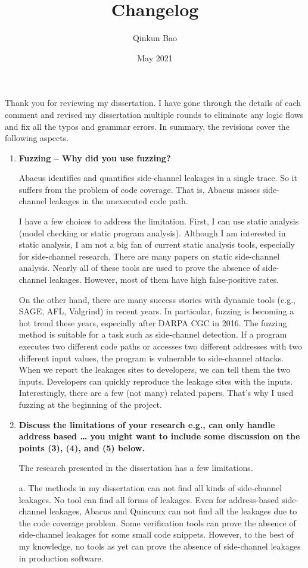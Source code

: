 \documentclass{article}
\title{Changelog}
\author{Qinkun Bao}
\date{May 2021}
\begin{document}
\maketitle
Thank you for reviewing my dissertation. I have gone through the details of each comment and revised my dissertation multiple rounds to eliminate any logic flows and fix all the typos and grammar errors. In summary, the revisions cover the following aspects.


\begin{enumerate}
\item \textbf{Fuzzing – Why did you use fuzzing?}

Abacus identifies and quantifies side-channel leakages in a single trace. So it suffers from the problem of code coverage.  That is, Abacus misses side-channel leakages in the unexecuted code path. 

I have a few choices to address the limitation. First, I can use static analysis (model checking or static program analysis). Although I am interested in static analysis, I am not a big fan of current static analysis tools, especially for side-channel research. There are many papers on static side-channel analysis. Nearly all of these tools are used to prove the absence of side-channel leakages. However, most of them have high false-positive rates. 

On the other hand, there are many success stories with dynamic tools (e.g., SAGE, AFL, Valgrind) in recent years. In particular, fuzzing is becoming a hot trend these years, especially after DARPA CGC in 2016. The fuzzing method is suitable for a task such as side-channel detection. If a program executes two different code paths or accesses two different addresses with two different input values, the program is vulnerable to side-channel attacks. When we report the leakages sites to developers, we can tell them the two inputs. Developers can quickly reproduce the leakage sites with the inputs.  Interestingly, there are a few (not many) related papers. That's why I used fuzzing at the beginning of the project.


\item \textbf{Discuss the limitations of your research
e.g., can only handle address based …
you might want to include some discussion on the points (3), (4), and (5) below.}

The research presented in the dissertation has a few limitations.

a. The methods in my dissertation can not find all kinds of side-channel leakages. No tool can find all forms of leakages. Even for address-based side-channel leakages, Abacus and Quincunx can not find all the leakages due to the code coverage problem. Some verification tools can prove the absence of side-channel leakages for some small code snippets. However, to the best of my knowledge, no tools as yet can prove the absence of side-channel leakages in production software.


\end{enumerate}
\end{document}
